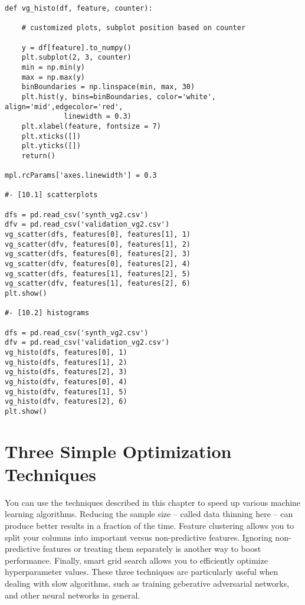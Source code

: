 \documentclass[oneside,10pt]{book}
\begin{document}
\begin{lstlisting}
def vg_histo(df, feature, counter):

    # customized plots, subplot position based on counter

    y = df[feature].to_numpy()
    plt.subplot(2, 3, counter)
    min = np.min(y)
    max = np.max(y)
    binBoundaries = np.linspace(min, max, 30)
    plt.hist(y, bins=binBoundaries, color='white', align='mid',edgecolor='red',
              linewidth = 0.3) 
    plt.xlabel(feature, fontsize = 7)
    plt.xticks([])
    plt.yticks([])
    return()

mpl.rcParams['axes.linewidth'] = 0.3

#- [10.1] scatterplots 

dfs = pd.read_csv('synth_vg2.csv')
dfv = pd.read_csv('validation_vg2.csv')
vg_scatter(dfs, features[0], features[1], 1)
vg_scatter(dfv, features[0], features[1], 2)
vg_scatter(dfs, features[0], features[2], 3)
vg_scatter(dfv, features[0], features[2], 4)
vg_scatter(dfs, features[1], features[2], 5)
vg_scatter(dfv, features[1], features[2], 6)
plt.show()

#- [10.2] histograms

dfs = pd.read_csv('synth_vg2.csv')
dfv = pd.read_csv('validation_vg2.csv')
vg_histo(dfs, features[0], 1)
vg_histo(dfs, features[1], 2)
vg_histo(dfs, features[2], 3)
vg_histo(dfv, features[0], 4)
vg_histo(dfv, features[1], 5)
vg_histo(dfv, features[2], 6)
plt.show()
\end{lstlisting}




\chapter{Three Simple Optimization Techniques}\label{3opt}

You can use the techniques described in this chapter to speed up various machine learning algorithms. Reducing the sample size -- called data thinning here -- can produce better results in a fraction of the time.  Feature clustering allows you to split your columns into important versus non-predictive features. Ignoring non-predictive features or treating them separately is another way to boost performance. Finally, smart grid search allows you to  efficiently optimize hyperparameter values. These three techniques are particularly useful when dealing with slow algorithms, such as training geberative adversarial networks, and other neural networks in general. 
\end{document}
